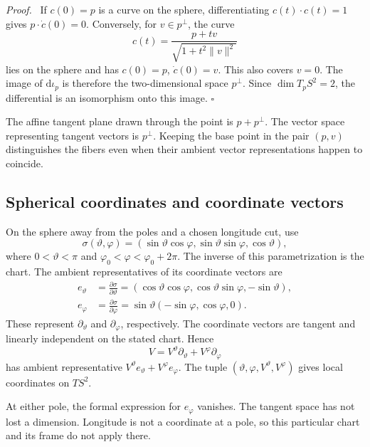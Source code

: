 \documentclass[11pt,a4paper]{article}
\numberwithin{equation}{section}
\newcommand{\dd}{\mathrm d}
\newcommand{\proofend}{\unskip\nobreak\hfill\(\square\)\par}
\newenvironment{proof}{\par\noindent\textit{Proof.}\ }{\proofend}
\begin{document}
\begin{proof}
If \(c(0)=p\) is a curve on the sphere, differentiating
\(c(t)\cdot c(t)=1\) gives \(p\cdot\dot c(0)=0\). Conversely, for
\(v\in p^\perp\), the curve
\[
 c(t)=\frac{p+tv}{\sqrt{1+t^2\lVert v\rVert^2}}
\]
lies on the sphere and has \(c(0)=p\), \(\dot c(0)=v\). This also covers
\(v=0\). The image of \(\dd\iota_p\) is therefore the two-dimensional
space \(p^\perp\). Since \(\dim T_pS^2=2\), the differential is an
isomorphism onto this image.
\end{proof}

The affine tangent plane drawn through the point is \(p+p^\perp\). The
vector space representing tangent vectors is \(p^\perp\). Keeping the base
point in the pair \((p,v)\) distinguishes the fibers even when their ambient
vector representations happen to coincide.

\subsection{Spherical coordinates and coordinate vectors}

On the sphere away from the poles and a chosen longitude cut, use
\[
 \sigma(\vartheta,\varphi)=
 (\sin\vartheta\cos\varphi,\sin\vartheta\sin\varphi,\cos\vartheta),
\]
where \(0<\vartheta<\pi\) and
\(\varphi_0<\varphi<\varphi_0+2\pi\). The inverse of this parametrization
is the chart. The ambient representatives of its coordinate vectors are
\begin{align}
 e_\vartheta&=\frac{\partial\sigma}{\partial\vartheta}
 =(\cos\vartheta\cos\varphi,\cos\vartheta\sin\varphi,-\sin\vartheta),
 \label{eq:sphere-etheta}\\
 e_\varphi&=\frac{\partial\sigma}{\partial\varphi}
 =\sin\vartheta(-\sin\varphi,\cos\varphi,0).
 \label{eq:sphere-ephi}
\end{align}
These represent \(\partial_\vartheta\) and \(\partial_\varphi\), respectively.
The coordinate vectors are tangent and linearly independent on the stated chart. Hence
\[
 V=V^\vartheta\partial_\vartheta+V^\varphi\partial_\varphi
\]
has ambient representative
\(V^\vartheta e_\vartheta+V^\varphi e_\varphi\). The tuple
\((\vartheta,\varphi,V^\vartheta,V^\varphi)\) gives local coordinates on
\(TS^2\).

At either pole, the formal expression for \(e_\varphi\) vanishes. The tangent
space has not lost a dimension. Longitude is not a coordinate at a pole, so
this particular chart and its frame do not apply there.
\end{document}
